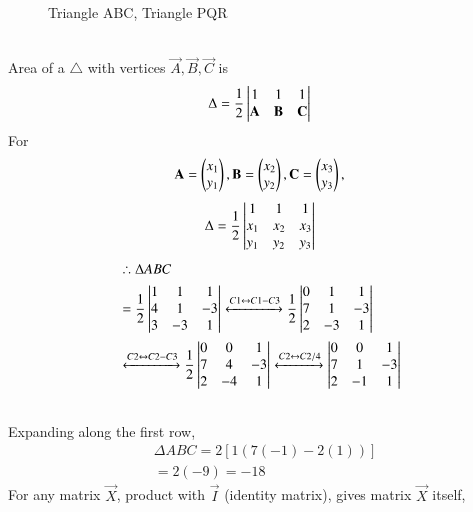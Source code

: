 \documentclass[journal,12pt,twocolumn]{IEEEtran}
\renewcommand\thesection{\arabic{section}}
\begin{document}
\begin{enumerate}[label=\thesection.\arabic*.,ref=\thesection.\theenumi]
\begin{figure}[!ht]
    \caption{Triangle ABC, Triangle PQR}
    \label{fig:Triangles}
\end{figure}\\
Area of a $\triangle$ with vertices
$\vec{A}, \vec{B}, \vec{C}$ is
\begin{align}
\label{eq:area_tri_1}
\Delta = \frac{1}{2}\begin{vmatrix}1 & 1 & 1\\ \mathbf{A} & \mathbf{B} & \mathbf{C}\end{vmatrix}
\end{align}
For
\begin{align}
\mathbf{A} = \begin{pmatrix}x_{1}\\y_{1}\end{pmatrix}, \mathbf{B} =\begin{pmatrix}x_{2}\\y_{2}\end{pmatrix}, \mathbf{C} =\begin{pmatrix}x_{3}\\y_{3}\end{pmatrix},
\end{align}
\begin{align}
\label{eq:area_tri_2}
\Delta = \frac{1}{2}\begin{vmatrix}1 & 1 & 1\\ x_{1}& x_{2} & x_{3}\\ y_{1} & y_{2} & y_{3}\end{vmatrix}
\end{align}
\begin{equation}
\begin{split}
&\therefore\Delta ABC \\&=\frac{1}{2}\begin{vmatrix}1 & 1 & 1\\ 4 & 1 & -3\\ 3 & -3& 1\end{vmatrix}
\xleftrightarrow[]{C1\leftrightarrow C1-C3}\frac{1}{2}\begin{vmatrix}0 & 1 & 1\\ 7 & 1 & -3\\ 2 & -3 & 1\end{vmatrix}\\
&\xleftrightarrow[]{C2\leftrightarrow C2-C3}\frac{1}{2}\begin{vmatrix}0 & 0 & 1\\ 7 & 4 & -3\\ 2 & -4 & 1\end{vmatrix}
\xleftrightarrow[]{C2\leftrightarrow C2/4}\begin{vmatrix}0 & 0 & 1\\7 & 1 & -3\\2 & -1 & 1\end{vmatrix}\\\\
\end{split}
\end{equation}
Expanding along the first row,
\begin{equation}\label{eq:area_abc}
\begin{split}
&\Delta ABC=2\left [ 1(7(-1)-2(1)) \right ]\\&=2\left ( -9 \right )=-18
\end{split}
\end{equation}
For any matrix $\vec{X}$, product with $\vec{I}$ (identity matrix), gives matrix $\vec{X}$ itself,

\end{enumerate}
\end{document}
